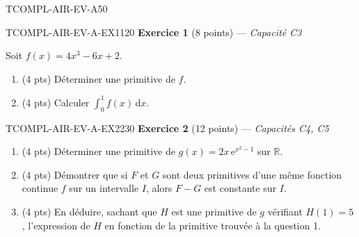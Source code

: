 

\begin{evaluation}{TCOMPL-AIR-EV-A}{50}

\begin{exercice}{TCOMPL-AIR-EV-A-EX1}{1}{20}
\textbf{Exercice 1} (8 points) --- \textit{Capacité C3}

\medskip

Soit $f(x) = 4x^3-6x+2$.
\begin{enumerate}
  \item (4 pts) Déterminer une primitive de $f$.
  \item (4 pts) Calculer $\displaystyle\int_0^1 f(x)\,\mathrm{d}x$.
\end{enumerate}
\end{exercice}

\begin{exercice}{TCOMPL-AIR-EV-A-EX2}{2}{30}
\textbf{Exercice 2} (12 points) --- \textit{Capacités C4, C5}

\medskip

\begin{enumerate}
  \item (4 pts) Déterminer une primitive de $g(x) = 2x\,\mathrm{e}^{x^2-1}$ sur $\mathbb{R}$.
  \item (4 pts) Démontrer que si $F$ et $G$ sont deux primitives d'une même fonction continue $f$ sur un intervalle $I$, alors $F-G$ est constante sur $I$.
  \item (4 pts) En déduire, sachant que $H$ est une primitive de $g$ vérifiant $H(1)=5$, l'expression de $H$ en fonction de la primitive trouvée à la question 1.
\end{enumerate}
\end{exercice}

\end{evaluation}
